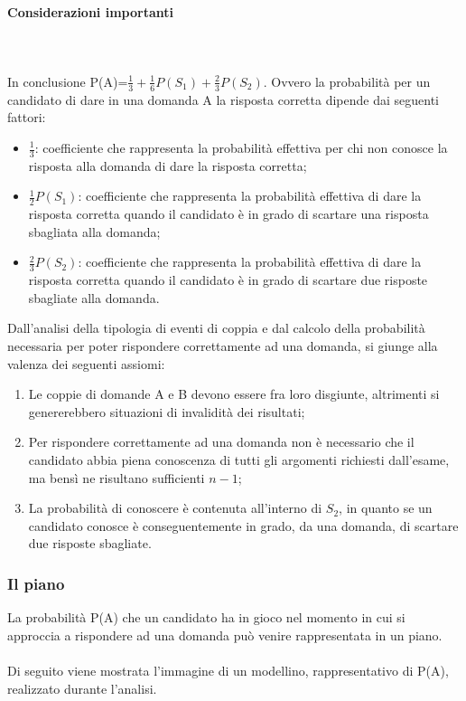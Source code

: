  \paragraph{Considerazioni importanti} \mbox{}\\\\
 \label{Considerazioni importanti}
 \noindent
  In conclusione P(A)=$\frac{1}{3}+\frac{1}{6}P(S_1)+\frac{2}{3}P(S_2)$.
  Ovvero la probabilit\`a  per un candidato di dare in una domanda A la risposta corretta dipende dai seguenti fattori:
  \begin{itemize}
  \item $\frac{1}{3}$: coefficiente che rappresenta la probabilit\`a effettiva per chi non conosce la risposta alla domanda di dare la risposta corretta;
  \item $\frac{1}{2}P(S_1)$: coefficiente che rappresenta la probabilit\`a effettiva di  dare la risposta corretta quando il candidato \`e in grado di scartare una risposta sbagliata alla domanda;
   \item $\frac{2}{3}P(S_2)$: coefficiente che rappresenta la probabilit\`a effettiva di  dare la risposta corretta quando il candidato \`e in grado di scartare due risposte sbagliate alla domanda.
  \end{itemize}
  \noindent
  Dall'analisi della tipologia di eventi di coppia e dal calcolo della probabilit\`a necessaria per poter rispondere correttamente ad una domanda, si giunge alla valenza dei seguenti assiomi:
  \begin{enumerate}
  \item Le coppie di domande A e B devono essere fra loro disgiunte, altrimenti si genererebbero situazioni di invalidit\`a dei risultati;
  \item Per rispondere correttamente ad una domanda non \`e necessario che il candidato abbia piena conoscenza di tutti gli argomenti richiesti dall'esame, ma bens\`i ne risultano sufficienti $n-1$;
  \item La probabilit\`a di conoscere \`e contenuta all'interno di $S_{2}$, in quanto se un candidato conosce \`e conseguentemente in grado, da una domanda, di scartare due risposte sbagliate.
  \end{enumerate}
  
\subsubsection{Il piano}
\label{Il piano}
\noindent
La probabilit\`a P(A) che un candidato ha in gioco nel momento in cui si approccia a rispondere ad una domanda pu\`o venire rappresentata in un piano.\\\\
Di seguito viene mostrata l'immagine di un modellino, rappresentativo di P(A), realizzato durante l'analisi.

